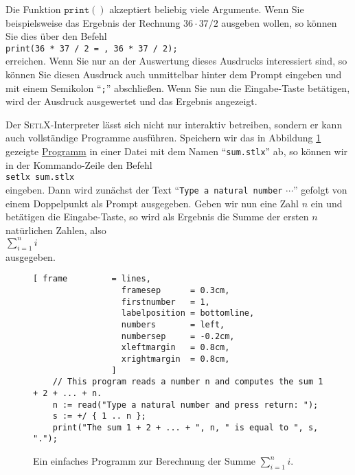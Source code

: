 Die Funktion $\mathtt{print}()$ akzeptiert beliebig viele Argumente.  Wenn Sie
beispielsweise das Ergebnis der Rechnung $36 \cdot 37 / 2$ ausgeben wollen, so können Sie dies über den Befehl
\\[0.2cm]
\hspace*{1.3cm}
\texttt{print(36 * 37 / 2 = , 36 * 37 / 2);}
\\[0.2cm]
erreichen.  Wenn Sie nur an der Auswertung dieses Ausdrucks interessiert sind, so können Sie diesen 
Ausdruck auch unmittelbar hinter dem Prompt eingeben und mit einem Semikolon ``\texttt{;}'' abschließen.
Wenn Sie nun die Eingabe-Taste betätigen, wird der Ausdruck ausgewertet und das Ergebnis angezeigt.

Der \textsc{SetlX}-Interpreter lässt sich nicht nur interaktiv betreiben, sondern er kann auch vollständige
Programme ausführen.  Speichern wir das in Abbildung \ref{fig:sum.stlx} gezeigte 
\href{https://github.com/karlstroetmann/Logik/blob/master/SetlX/sum.stlx}{Programm} in einer Datei mit
dem Namen ``\texttt{sum.stlx}'' ab, so können wir in der Kommando-Zeile den Befehl
\\[0.2cm]
\hspace*{1.3cm}
\texttt{setlx sum.stlx}
\\[0.2cm] 
eingeben.  Dann wird zunächst der Text ``\texttt{Type a natural number} $\cdots$'' gefolgt von einem
Doppelpunkt als Prompt ausgegeben.  Geben wir nun eine Zahl $n$ ein und betätigen die Eingabe-Taste, so wird
als Ergebnis die Summe der ersten $n$ natürlichen Zahlen, also
\\[0.2cm]
\hspace*{1.3cm}
$\sum\limits_{i=1}^n i$ 
\\[0.2cm]
ausgegeben.

\begin{figure}[!ht]
\centering
\begin{Verbatim}[ frame         = lines, 
                  framesep      = 0.3cm, 
                  firstnumber   = 1,
                  labelposition = bottomline,
                  numbers       = left,
                  numbersep     = -0.2cm,
                  xleftmargin   = 0.8cm,
                  xrightmargin  = 0.8cm,
                ]
    // This program reads a number n and computes the sum 1 + 2 + ... + n.
    n := read("Type a natural number and press return: ");
    s := +/ { 1 .. n };
    print("The sum 1 + 2 + ... + ", n, " is equal to ", s, ".");
\end{Verbatim}
\vspace*{-0.3cm}
\caption{Ein einfaches Programm zur Berechnung der Summe $\sum\limits_{i=1}^n i$.}
\label{fig:sum.stlx}
\end{figure}


